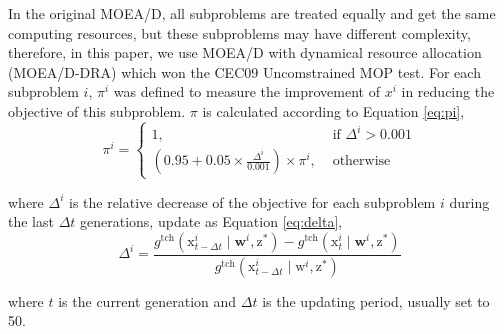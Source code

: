 \documentclass[journal]{IEEEtran}
\begin{document}
In the original MOEA/D, all subproblems are treated equally and get the same computing resources,
but these subproblems may have different complexity, therefore, in this paper, we use MOEA/D with dynamical resource allocation (MOEA/D-DRA) \cite{moead-dra} which won the CEC09 Uncomstrained MOP test.
For each subproblem $i$, $\pi^i$ was defined to measure the improvement of $x^i$ in reducing the objective of this subproblem. $\pi$ is calculated according to Equation \ref{eq:pi},
\begin{equation}
    \pi^{i}=\left\{\begin{array}{ll}
        1,                                                                     & \text { if } \Delta^{i}>0.001 \\
        \left(0.95+0.05 \times \frac{\Delta^{i}}{0.001}\right) \times \pi^{i}, & \text { otherwise }
    \end{array}\right.
    \label{eq:pi}
\end{equation}

where $\Delta^i$ is the relative decrease of the objective for each subproblem $i$ during the last $\Delta t$ generations, update as Equation \ref{eq:delta},
\begin{equation}
    \Delta^{i}=\frac{g^{\mathrm{tch}}\left(\mathrm{x}_{t-\Delta t}^{i} \mid \mathbf{w}^{i}, \mathrm{z}^{*}\right)-g^{\mathrm{tch}}\left(\mathrm{x}_{t}^{i} \mid \mathbf{w}^{i}, \mathrm{z}^{*}\right)}{g^{\mathrm{tch}}\left(\mathrm{x}_{t-\Delta t}^{i} \mid \mathrm{w}^{i}, \mathrm{z}^{*}\right)}
    \label{eq:delta}
\end{equation}

where $t$ is the current generation and $\Delta t$ is the updating period, usually set to 50.
\end{document}
